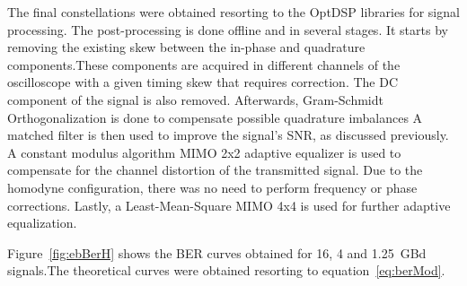 	The final constellations were obtained resorting to the OptDSP libraries for
	signal processing. The post-processing is done offline and in several stages.
	It starts by removing the existing skew between the in-phase and quadrature
	components.These components are acquired in different channels of the
	oscilloscope with a given timing skew that requires correction. The DC
	component of the signal is also removed. Afterwards, Gram-Schmidt
	Orthogonalization is done to compensate possible quadrature imbalances A
	matched filter is then used to improve the signal's SNR, as discussed
	previously. A constant modulus algorithm MIMO 2x2 adaptive equalizer is used
	to compensate for the channel distortion of the transmitted signal. Due to the
	homodyne configuration, there was no need to perform frequency or phase
	corrections. Lastly, a Least-Mean-Square MIMO 4x4 is used for further adaptive
	equalization.

	Figure~\ref{fig:ebBerH} shows the BER curves obtained for 16, 4 and 1.25~GBd signals.The
	theoretical curves were obtained resorting to equation~\ref{eq:berMod}.

